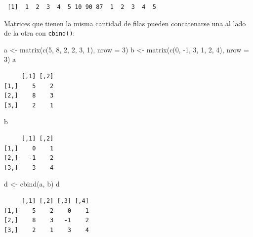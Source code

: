 \documentclass[
]{book}
\newenvironment{Shaded}{\begin{snugshade}}{\end{snugshade}}
\newcommand{\AttributeTok}[1]{\textcolor[rgb]{0.77,0.63,0.00}{#1}}
\newcommand{\DecValTok}[1]{\textcolor[rgb]{0.00,0.00,0.81}{#1}}
\newcommand{\FunctionTok}[1]{\textcolor[rgb]{0.00,0.00,0.00}{#1}}
\newcommand{\NormalTok}[1]{#1}
\newcommand{\OtherTok}[1]{\textcolor[rgb]{0.56,0.35,0.01}{#1}}
\newcommand{\SpecialCharTok}[1]{\textcolor[rgb]{0.00,0.00,0.00}{#1}}
\begin{document}
\begin{verbatim}
 [1]  1  2  3  4  5 10 90 87  1  2  3  4  5
\end{verbatim}

Matrices que tienen la misma cantidad de filas pueden concatenarse una al lado de la otra con \texttt{cbind()}:

\begin{Shaded}
\begin{Highlighting}[]
\NormalTok{a }\OtherTok{\textless{}{-}} \FunctionTok{matrix}\NormalTok{(}\FunctionTok{c}\NormalTok{(}\DecValTok{5}\NormalTok{, }\DecValTok{8}\NormalTok{, }\DecValTok{2}\NormalTok{, }\DecValTok{2}\NormalTok{, }\DecValTok{3}\NormalTok{, }\DecValTok{1}\NormalTok{), }\AttributeTok{nrow =} \DecValTok{3}\NormalTok{)}
\NormalTok{b }\OtherTok{\textless{}{-}} \FunctionTok{matrix}\NormalTok{(}\FunctionTok{c}\NormalTok{(}\DecValTok{0}\NormalTok{, }\SpecialCharTok{{-}}\DecValTok{1}\NormalTok{, }\DecValTok{3}\NormalTok{, }\DecValTok{1}\NormalTok{, }\DecValTok{2}\NormalTok{, }\DecValTok{4}\NormalTok{), }\AttributeTok{nrow =} \DecValTok{3}\NormalTok{)}
\NormalTok{a}
\end{Highlighting}
\end{Shaded}

\begin{verbatim}
     [,1] [,2]
[1,]    5    2
[2,]    8    3
[3,]    2    1
\end{verbatim}

\begin{Shaded}
\begin{Highlighting}[]
\NormalTok{b}
\end{Highlighting}
\end{Shaded}

\begin{verbatim}
     [,1] [,2]
[1,]    0    1
[2,]   -1    2
[3,]    3    4
\end{verbatim}

\begin{Shaded}
\begin{Highlighting}[]
\NormalTok{d }\OtherTok{\textless{}{-}} \FunctionTok{cbind}\NormalTok{(a, b)}
\NormalTok{d}
\end{Highlighting}
\end{Shaded}

\begin{verbatim}
     [,1] [,2] [,3] [,4]
[1,]    5    2    0    1
[2,]    8    3   -1    2
[3,]    2    1    3    4
\end{verbatim}
\end{document}
